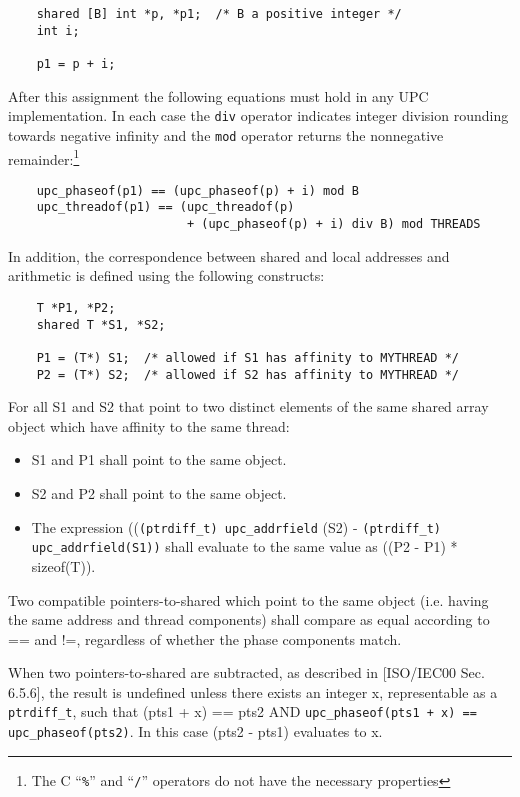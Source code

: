       
\begin{verbatim}
    shared [B] int *p, *p1;  /* B a positive integer */ 
    int i;  

    p1 = p + i;  
\end{verbatim}
    
\np After this assignment the following equations must hold
   in any UPC implementation.  In each case the {\tt div} operator
   indicates integer division rounding towards negative infinity and
   the {\tt mod} operator returns the nonnegative
   remainder:\footnote{The C ``{\tt \%}'' and ``{\tt /}''
   operators do not have the necessary properties}

    
\begin{verbatim}
    upc_phaseof(p1) == (upc_phaseof(p) + i) mod B 
    upc_threadof(p1) == (upc_threadof(p) 
                         + (upc_phaseof(p) + i) div B) mod THREADS 
\end{verbatim}    

\np In addition, the correspondence between shared and
   local addresses and arithmetic is defined using the following
   constructs:

\begin{verbatim}
    T *P1, *P2;  
    shared T *S1, *S2;  

    P1 = (T*) S1;  /* allowed if S1 has affinity to MYTHREAD */ 
    P2 = (T*) S2;  /* allowed if S2 has affinity to MYTHREAD */ 
\end{verbatim}    
    

\np For all S1 and S2 that point to two distinct elements of
   the same shared array object which have affinity to the same
   thread:

\begin{itemize}
\item S1 and P1 shall point to the same object. 
\item S2 and P2 shall point to the same object. 
\item The expression (({\tt (ptrdiff\_t) upc\_addrfield} (S2) -  {\tt (ptrdiff\_t) upc\_addrfield(S1))} shall 
   evaluate to the same value as ((P2 - P1) * sizeof(T)).  
\end{itemize}

\np Two compatible pointers-to-shared which point to the same
    object (i.e. having the same address and thread components) shall
    compare as equal according to == and !=, regardless of whether the 
    phase components match.

\np When two pointers-to-shared are subtracted, as described in
    [ISO/IEC00 Sec. 6.5.6], the result is undefined unless there exists
    an integer x, representable as a {\tt ptrdiff\_t}, such that (pts1 + x) == pts2
    AND {\tt upc\_phaseof(pts1 + x) == upc\_phaseof(pts2)}.
    In this case (pts2 - pts1) evaluates to x.


